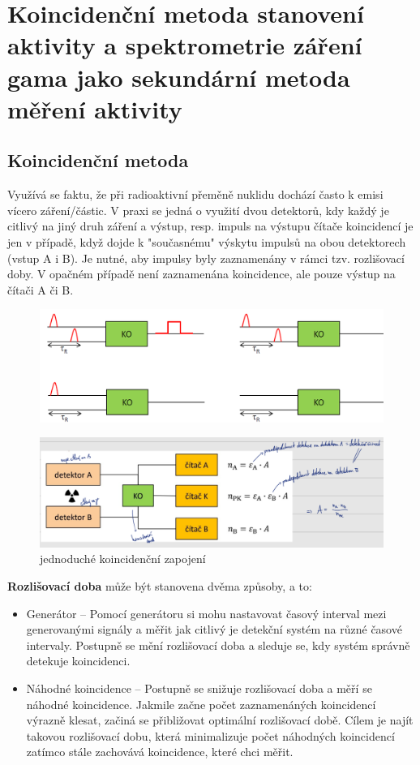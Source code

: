\section[Koincidenční metoda \& spektrometrie gama]{Koincidenční metoda stanovení aktivity a spektrometrie záření gama jako sekundární metoda měření aktivity}

\subsection{Koincidenční metoda}

Využívá se faktu, že při radioaktivní přeměně nuklidu dochází často k emisi vícero záření/částic. V praxi se jedná o využití dvou detektorů, kdy každý je citlivý na jiný druh záření a výstup, resp. impuls na výstupu čítače koincidencí je jen v případě, když dojde k "současnému" výskytu impulsů na obou detektorech (vstup A i B). Je nutné, aby impulsy byly zaznamenány v rámci tzv. rozlišovací doby. V opačném případě není zaznamenána koincidence, ale pouze výstup na čítači A či B.

\begin{figure}[H]
\centering
\includegraphics[width=0.7\linewidth]{img/koin-obvod.png}
\end{figure}

\begin{figure}[H]
    \centering
    \includegraphics[width=\linewidth]{img/jednoduché koincidenční zapojení.png}
    \caption{jednoduché koincidenční zapojení}
\end{figure}

\textbf{Rozlišovací doba} může být stanovena dvěma způsoby, a to:

\begin{itemize}
    \item Generátor -- Pomocí generátoru si mohu nastavovat časový interval mezi generovanými signály a měřit jak citlivý je detekční systém na různé časové intervaly. Postupně se mění rozlišovací doba a sleduje se, kdy systém správně detekuje koincidenci.
    \item Náhodné koincidence -- Postupně se snižuje rozlišovací doba a měří se náhodné koincidence. Jakmile začne počet zaznamenáných koincidencí výrazně klesat, začiná se přibližovat optimální rozlišovací době. Cílem je najít takovou rozlišovací dobu, která minimalizuje počet náhodných koincidencí zatímco stále zachovává koincidence, které chci měřit.
\end{itemize}

